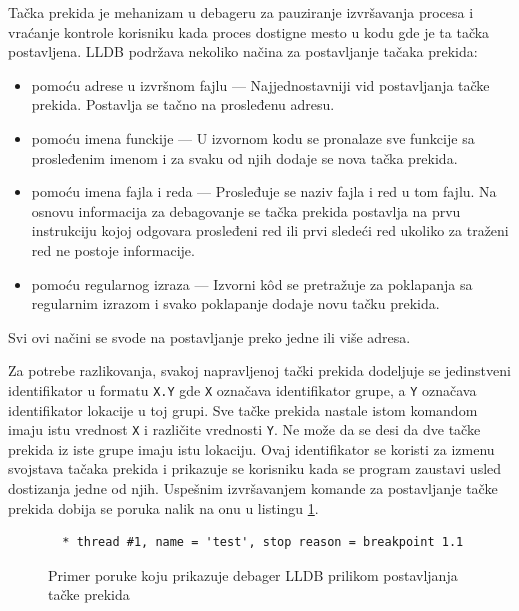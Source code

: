 \documentclass[12pt,oneside]{memoir}
\begin{document}
Tačka prekida je mehanizam u debageru za pauziranje izvršavanja procesa i vraćanje kontrole korisniku kada proces dostigne mesto u kodu gde je ta tačka postavljena.
LLDB podržava nekoliko načina za postavljanje tačaka prekida:
\begin{itemize}
  \item pomoću adrese u izvršnom fajlu --- Najjednostavniji vid postavljanja tačke prekida. Postavlja se tačno na prosleđenu adresu.
  \item pomoću imena funckije --- U izvornom kodu se pronalaze sve funkcije sa prosleđenim imenom i za svaku od njih dodaje se nova tačka prekida.
  \item pomoću imena fajla i reda --- Prosleđuje se naziv fajla i red u tom fajlu. Na osnovu informacija za debagovanje se tačka prekida postavlja na prvu instrukciju kojoj odgovara prosleđeni red ili prvi sledeći red ukoliko za traženi red ne postoje informacije.
  \item pomoću regularnog izraza --- Izvorni k\^od se pretražuje za poklapanja sa regularnim izrazom i svako poklapanje dodaje novu tačku prekida.
\end{itemize}
Svi ovi načini se svode na postavljanje preko jedne ili više adresa.

Za potrebe razlikovanja, svakoj napravljenoj tački prekida dodeljuje se jedinstveni identifikator u formatu \verb|X.Y| gde \verb|X| označava identifikator grupe, a \verb|Y| označava identifikator lokacije u toj grupi.
Sve tačke prekida nastale istom komandom imaju istu vrednost \verb|X| i različite vrednosti \verb|Y|.
Ne može da se desi da dve tačke prekida iz iste grupe imaju istu lokaciju.
Ovaj identifikator se koristi za izmenu svojstava tačaka prekida i prikazuje se korisniku kada se program zaustavi usled dostizanja jedne od njih.
Uspešnim izvršavanjem komande za postavljanje tačke prekida dobija se poruka nalik na onu u listingu \ref{lst:breakpoint_example}.

\begin{figure}[!ht]
\begin{verbatim}
  * thread #1, name = 'test', stop reason = breakpoint 1.1
\end{verbatim}
\caption{Primer poruke koju prikazuje debager LLDB prilikom postavljanja tačke prekida}
\label{lst:breakpoint_example}
\end{figure}
\end{document}
